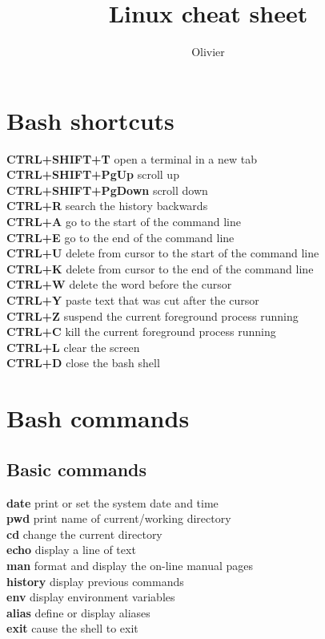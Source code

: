 \documentclass[11pt]{article}
\title{Linux cheat sheet}
\author{Olivier \bsc{Roques}}
\date{}
\newcommand{\command}[2]{\textsf{\textbf{#1}} \dotfill{} #2}
\begin{document}
\maketitle
\begin{multicols*}{2}


\section{Bash shortcuts}

\command{CTRL+SHIFT+T}{open a terminal in a new tab}\\
\command{CTRL+SHIFT+PgUp}{scroll up}\\
\command{CTRL+SHIFT+PgDown}{scroll down}\\
\command{CTRL+R}{search the history backwards}\\
\command{CTRL+A}{go to the start of the command line}\\
\command{CTRL+E}{go to the end of the command line}\\
\command{CTRL+U}{delete from cursor to the start of the command line}\\
\command{CTRL+K}{delete from cursor to the end of the command line}\\
\command{CTRL+W}{delete the word before the cursor}\\
\command{CTRL+Y}{paste text that was cut after the cursor}\\
\command{CTRL+Z}{suspend the current foreground process running}\\
\command{CTRL+C}{kill the current foreground process running}\\
\command{CTRL+L}{clear the screen}\\
\command{CTRL+D}{close the bash shell}


\section{Bash commands}

\subsection{Basic commands}

\command{date}{print or set the system date and time}\\
\command{pwd}{print name of current/working directory}\\
\command{cd}{change the current directory}\\
\command{echo}{display a line of text}\\
\command{man}{format and display the on-line manual pages}\\
\command{history}{display previous commands}\\
\command{env}{display environment variables}\\
\command{alias}{define or display aliases}\\
\command{exit}{cause the shell to exit}



\end{multicols*}
\end{document}
